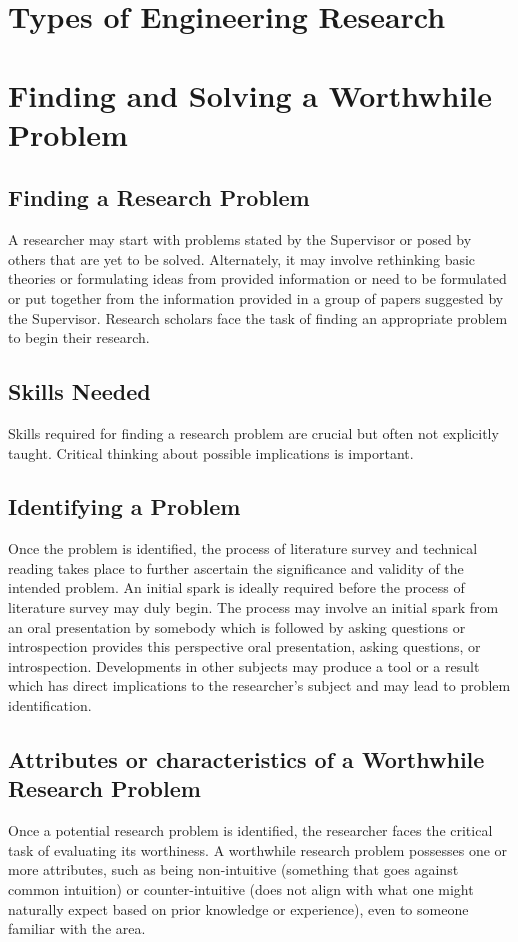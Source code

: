 \documentclass{article}
\begin{document}
	\section{Types of Engineering Research}

	\section{Finding and Solving a Worthwhile Problem}
	\subsection{Finding a Research Problem}
	A researcher may start with problems stated by the Supervisor or posed by others that are yet to be solved.
	Alternately, it may involve rethinking basic theories or formulating ideas from provided information or
	need to be formulated or put together from the information provided in a group of papers suggested by the
	Supervisor.
	Research scholars face the task of finding an appropriate problem to begin their research.

	\subsection{Skills Needed}
	Skills required for finding a research problem are crucial but often not explicitly taught.
	Critical thinking about possible implications is important.

	\subsection{Identifying a Problem}
	Once the problem is identified, the process of literature survey and technical reading takes place to
	further ascertain the significance and validity of the intended problem.
	An initial spark is ideally required before the process of literature survey may duly begin.
	The process may involve an initial spark from an oral presentation by somebody which is followed by asking
	questions or introspection provides this perspective oral presentation, asking questions, or introspection.
	Developments in other subjects may produce a tool or a result which has direct implications to the
	researcher's subject and may lead to problem identification.

	\subsection{Attributes or characteristics of a Worthwhile Research Problem}
	Once a potential research problem is identified, the researcher faces the critical task of evaluating its
	worthiness.
	A worthwhile research problem possesses one or more attributes, such as being non-intuitive (something that
	goes against common intuition) or counter-intuitive (does not align with what one might naturally expect
	based on prior knowledge or experience), even to someone familiar with the area.
\end{document}
